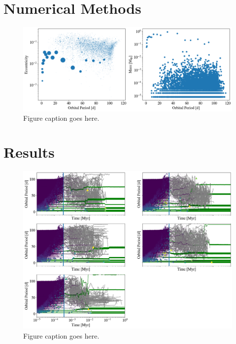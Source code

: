 \section{Numerical Methods} \label{sec:numerical}

\begin{figure}
\begin{center}
    \includegraphics[width=\textwidth]{figures/stip/changa_ics.png}
    \caption{Figure caption goes here.\label{fig:changa_ics}}
\end{center}
\end{figure}

\section{Results} \label{sec:results}

\begin{figure}
\begin{center}
    \includegraphics[width=\textwidth]{figures/stip/full_coll_evo.png}
    \caption{Figure caption goes here.\label{fig:full_coll_evo}}
\end{center}
\end{figure}

